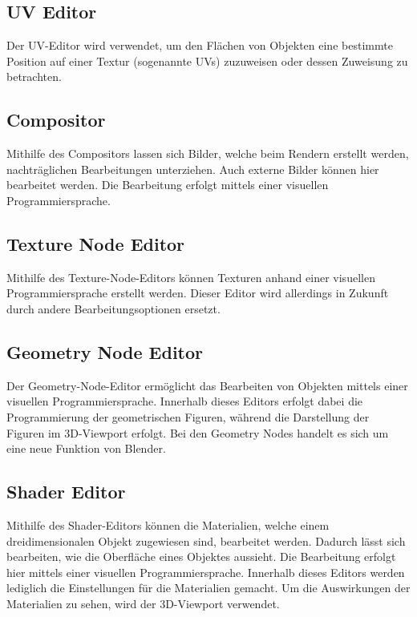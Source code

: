 \documentclass[
]{book}
\begin{document}
\subsection{UV Editor}\label{uv-editor}

Der UV-Editor wird verwendet, um den Flächen von Objekten eine bestimmte
Position auf einer Textur (sogenannte UVs) zuzuweisen oder dessen
Zuweisung zu betrachten.

\subsection{Compositor}\label{compositor}

Mithilfe des Compositors lassen sich Bilder, welche beim Rendern
erstellt werden, nachträglichen Bearbeitungen unterziehen. Auch externe
Bilder können hier bearbeitet werden. Die Bearbeitung erfolgt mittels
einer visuellen Programmiersprache.

\subsection{Texture Node Editor}\label{texture-node-editor}

Mithilfe des Texture-Node-Editors können Texturen anhand einer visuellen
Programmiersprache erstellt werden. Dieser Editor wird allerdings in
Zukunft durch andere Bearbeitungsoptionen ersetzt.

\subsection{Geometry Node Editor}\label{geometry-node-editor}

Der Geometry-Node-Editor ermöglicht das Bearbeiten von Objekten mittels
einer visuellen Programmiersprache. Innerhalb dieses Editors erfolgt
dabei die Programmierung der geometrischen Figuren, während die
Darstellung der Figuren im 3D-Viewport erfolgt. Bei den Geometry Nodes
handelt es sich um eine neue Funktion von Blender.

\subsection{Shader Editor}\label{shader-editor}

Mithilfe des Shader-Editors können die Materialien, welche einem
dreidimensionalen Objekt zugewiesen sind, bearbeitet werden. Dadurch
lässt sich bearbeiten, wie die Oberfläche eines Objektes aussieht. Die
Bearbeitung erfolgt hier mittels einer visuellen Programmiersprache.
Innerhalb dieses Editors werden lediglich die Einstellungen für die
Materialien gemacht. Um die Auswirkungen der Materialien zu sehen, wird
der 3D-Viewport verwendet.
\end{document}
